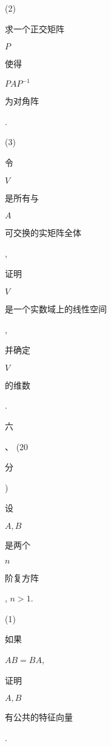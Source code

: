 \documentclass[10pt]{article}
\begin{document}
(2) \begin{CJK}{UTF8}{mj}求一个正交矩阵\end{CJK} $P$ \begin{CJK}{UTF8}{mj}使得\end{CJK} $P A P^{-1}$ \begin{CJK}{UTF8}{mj}为对角阵\end{CJK}.

(3) \begin{CJK}{UTF8}{mj}令\end{CJK} $V$ \begin{CJK}{UTF8}{mj}是所有与\end{CJK} $A$ \begin{CJK}{UTF8}{mj}可交换的实矩阵全体\end{CJK}, \begin{CJK}{UTF8}{mj}证明\end{CJK} $V$ \begin{CJK}{UTF8}{mj}是一个实数域上的线性空间\end{CJK}, \begin{CJK}{UTF8}{mj}并确定\end{CJK} $V$ \begin{CJK}{UTF8}{mj}的维数\end{CJK}. \begin{CJK}{UTF8}{mj}六\end{CJK}、 (20 \begin{CJK}{UTF8}{mj}分\end{CJK}) \begin{CJK}{UTF8}{mj}设\end{CJK} $A, B$ \begin{CJK}{UTF8}{mj}是两个\end{CJK} $n$ \begin{CJK}{UTF8}{mj}阶复方阵\end{CJK}, $n>1$.

(1) \begin{CJK}{UTF8}{mj}如果\end{CJK} $A B=B A$, \begin{CJK}{UTF8}{mj}证明\end{CJK} $A, B$ \begin{CJK}{UTF8}{mj}有公共的特征向量\end{CJK}.
\end{document}
